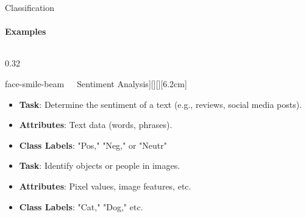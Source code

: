 \documentclass[aspectratio=169]{beamer}
\begin{document}
\begin{frame}{Classification}
    \framesubtitle{Examples}

    \vspace{-1cm}
    \begin{columns}
        \begin{column}{0.32\textwidth}
        
            \begin{coloredblock}[yellow][\faIcon[regular]{face-smile-beam}~~~Sentiment Analysis][\footnotesize\centering][][6.2cm]
                \begin{itemize}
                    \item \scriptsize \textbf{Task}: Determine the sentiment of a text (e.g., reviews, social media posts).
                    \item \scriptsize \textbf{Attributes}: Text data (words, phrases).
                    \item \scriptsize \textbf{Class Labels}: "Pos," "Neg," or "Neutr"
                \end{itemize}
            \end{coloredblock}
            \vspace{0.1cm}
            \begin{coloredblock}
                    \begin{itemize}
                        \item \scriptsize \textbf{Task}: Identify objects or people in images.
                        \item \scriptsize \textbf{Attributes}: Pixel values, image features, etc.
                        \item \scriptsize \textbf{Class Labels}: "Cat," "Dog," etc.
                    \end{itemize}
            \end{coloredblock}
            

\end{column}
\end{columns}
\end{frame}
\end{document}
